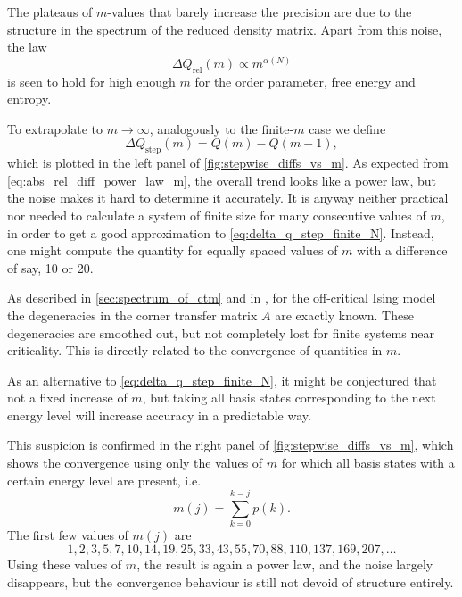 The plateaus of $m$-values that barely increase the precision are due to the structure in the spectrum of the reduced
density matrix. Apart from this noise, the law
\begin{equation}\label{eq:abs_rel_diff_power_law_m}
  \Delta Q_{\text{rel}}(m) \propto m^{\alpha(N)}
\end{equation}
is seen to hold for high enough $m$ for the order parameter, free energy and entropy.

To extrapolate to $m \to \infty$, analogously to the finite-$m$ case we define
\begin{equation}\label{eq:delta_q_step_finite_N}
  \Delta Q_{\text{step}}(m) = Q(m) - Q(m - 1),
\end{equation}
which is plotted in the left panel of \autoref{fig:stepwise_diffs_vs_m}.
As expected from \autoref{eq:abs_rel_diff_power_law_m}, the overall trend looks like a power law,
but the noise makes it hard to determine it accurately.
It is anyway neither practical nor needed to calculate a system of finite size for many consecutive values of $m$,
in order to get a good approximation to \autoref{eq:delta_q_step_finite_N}.
Instead, one might compute the quantity for equally spaced values of $m$ with a difference of say,
10 or 20.

As described in \autoref{sec:spectrum_of_ctm} and in \cite{okunishi1999universal,
davies1988corner, peschel2009reduced}, for the off-critical Ising model the degeneracies in the corner transfer matrix
$A$ are exactly known.
These degeneracies are smoothed out, but not completely lost for finite systems near criticality. This is directly related to the convergence of quantities in $m$.

As an alternative to \autoref{eq:delta_q_step_finite_N}, it might be conjectured that not a fixed increase of $m$,
but taking all basis states corresponding to the next energy level will increase accuracy in a predictable way.

This suspicion is confirmed in the right panel of \autoref{fig:stepwise_diffs_vs_m},
which shows the convergence using only the values of $m$ for which all basis states with a certain energy level are
present, i.e.
\cite{okunishi1999universal}
\begin{equation}
  m(j) = \sum_{k = 0}^{k = j} p(k).
\end{equation}
The first few values of $m(j)$ are
\begin{equation}\label{eq:m_values_all_degenerate_basis_states}
  1, 2, 3, 5, 7, 10, 14, 19, 25, 33, 43, 55, 70, 88, 110, 137, 169, 207, \dots
\end{equation}
Using these values of $m$, the result is again a power law, and the noise largely disappears, but the convergence
behaviour is still not devoid of structure entirely.

